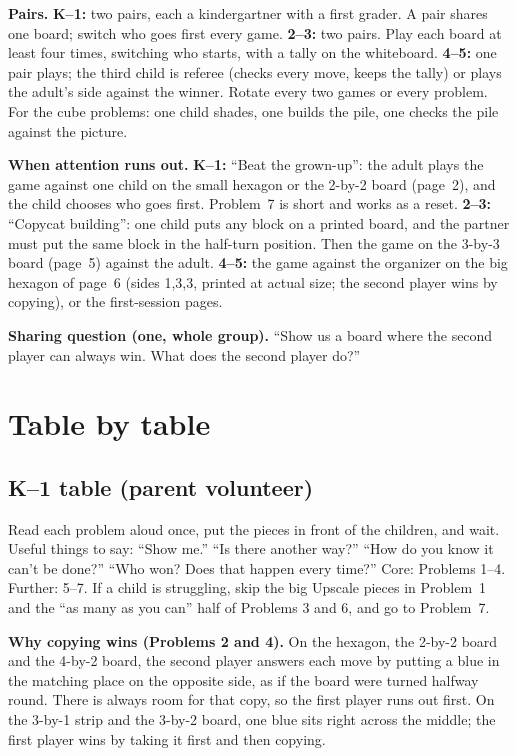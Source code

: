 \documentclass[10pt]{article}
\begin{document}
\textbf{Pairs.}
\textbf{K--1:} two pairs, each a kindergartner with a first grader. A pair shares one board; switch who goes first every game.
\textbf{2--3:} two pairs. Play each board at least four times, switching who starts, with a tally on the whiteboard.
\textbf{4--5:} one pair plays; the third child is referee (checks every move, keeps the tally) or plays the adult's side against the winner. Rotate every two games or every problem. For the cube problems: one child shades, one builds the pile, one checks the pile against the picture.

\textbf{When attention runs out.}
\textbf{K--1:} ``Beat the grown-up'': the adult plays the game against one child on the small hexagon or the 2-by-2 board (page~2), and the child chooses who goes first. Problem~7 is short and works as a reset.
\textbf{2--3:} ``Copycat building'': one child puts any block on a printed board, and the partner must put the same block in the half-turn position. Then the game on the 3-by-3 board (page~5) against the adult.
\textbf{4--5:} the game against the organizer on the big hexagon of page~6 (sides 1,3,3, printed at actual size; the second player wins by copying), or the first-session pages.

\textbf{Sharing question (one, whole group).} ``Show us a board where the second player can always win. What does the second player do?''

\section{Table by table}

\subsection{K--1 table (parent volunteer)}

Read each problem aloud once, put the pieces in front of the children, and wait. Useful things to say: ``Show me.'' ``Is there another way?'' ``How do you know it can't be done?'' ``Who won? Does that happen every time?''
Core: Problems 1--4. Further: 5--7. If a child is struggling, skip the big Upscale pieces in Problem~1 and the ``as many as you can'' half of Problems 3 and 6, and go to Problem~7.

\textbf{Why copying wins (Problems 2 and 4).} On the hexagon, the 2-by-2 board and the 4-by-2 board, the second player answers each move by putting a blue in the matching place on the opposite side, as if the board were turned halfway round. There is always room for that copy, so the first player runs out first. On the 3-by-1 strip and the 3-by-2 board, one blue sits right across the middle; the first player wins by taking it first and then copying.
\end{document}
